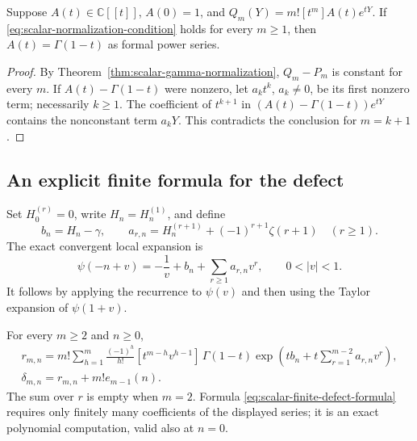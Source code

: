 \begin{proposition}
\label{prop:scalar-appell-family-uniqueness}
Suppose $A(t)\in\mathbb C[[t]]$, $A(0)=1$, and
$Q_m(Y)=m![t^m]A(t)e^{tY}$.  If
\eqref{eq:scalar-normalization-condition} holds for every $m\geq1$,
then $A(t)=\Gamma(1-t)$ as formal power series.
\end{proposition}

\begin{proof}
By Theorem~\ref{thm:scalar-gamma-normalization},
$Q_m-P_m$ is constant for every $m$.  If
$A(t)-\Gamma(1-t)$ were nonzero, let $a_k t^k$, $a_k\ne0$,
be its first nonzero term; necessarily $k\geq1$.  The coefficient
of $t^{k+1}$ in
$(A(t)-\Gamma(1-t))e^{tY}$ contains the nonconstant term
$a_kY$.  This contradicts the conclusion for $m=k+1$.
\end{proof}

\subsection{An explicit finite formula for the defect}

Set $H_0^{(r)}=0$, write $H_n=H_n^{(1)}$, and define
\begin{equation}
 b_n=H_n-\gamma,\qquad
 a_{r,n}=H_n^{(r+1)}+(-1)^{r+1}\zeta(r+1)\quad(r\geq1).
 \label{eq:scalar-local-coefficients}
\end{equation}
The exact convergent local expansion is
\begin{equation}
 \psi(-n+v)=-\frac1v+b_n+\sum_{r\geq1}a_{r,n}v^r,
                         \qquad0<|v|<1.
 \label{eq:scalar-digamma-laurent}
\end{equation}
It follows by applying the recurrence to $\psi(v)$ and then using
the Taylor expansion of $\psi(1+v)$.

\begin{proposition}
\label{prop:scalar-finite-defect}
For every $m\geq2$ and $n\geq0$,
\begin{equation}
 \begin{aligned}
 r_{m,n}=m!\sum_{h=1}^{m}\frac{(-1)^h}{h!}
 [t^{m-h}v^{h-1}]\,
 \Gamma(1-t)
 \exp\left(tb_n+t\sum_{r=1}^{m-2}a_{r,n}v^r\right),\\
 \delta_{m,n}=r_{m,n}+m!e_{m-1}(n).
 \end{aligned}
 \label{eq:scalar-finite-defect-formula}
\end{equation}
The sum over $r$ is empty when $m=2$.  Formula
\eqref{eq:scalar-finite-defect-formula} requires only finitely
many coefficients of the displayed series; it is an exact
polynomial computation, valid also at $n=0$.
\end{proposition}

